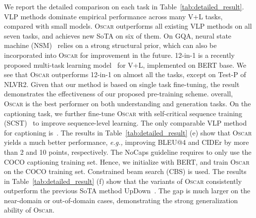 \documentclass[runningheads]{llncs}
\newcommand{\eg}[0]{\emph{e.g., }}
\newcommand{\short}{\textsc{Oscar}}
\newcommand{\shortb}{\textsc{Oscar}}
\begin{document}
We report the detailed comparison on each task in Table~\ref{tab:detailed_result}. 
 VLP methods dominate empirical performance across many V+L tasks, compared with small models. \short{} outperforms all existing VLP methods on all seven tasks, and achieves new SoTA on six of them. On GQA, neural state machine (NSM)~\cite{hudson2019learning} relies on a strong structural prior, which can also be incorporated into \short{} for improvement in the future.
 12-in-1 is a recently proposed multi-task learning model~\cite{lu201912} for V+L, implemented on BERT base. We see that \shortb{} outperforms 12-in-1 on almost all the tasks, except on Test-P of NLVR2. Given that our method is based on single task fine-tuning, the result demonstrates the effectiveness of our proposed pre-training scheme.
 overall, \short{} is the best performer on both understanding and generation tasks. 
On the captioning task, we further fine-tune \short{} with self-critical sequence training (SCST)~\cite{rennie2017self} to improve sequence-level learning. The only comparable VLP method for captioning is~\cite{zhou2019unified}. 
The results in Table~\ref{tab:detailed_result} (e) show that \short{} yields a much better performance, \eg improving BLEU@4 and CIDEr by more than 2 and 10 points, respectively.
 The NoCaps guideline requires to only use the COCO captioning training set. Hence, we initialize with BERT, and train \short{} on the COCO training set. Constrained beam search (CBS) is used. The results in Table~\ref{tab:detailed_result} (f) show that the variants of \short{} consistently outperform the previous SoTA method UpDown~\cite{agrawal2019nocaps}. The gap is much larger on the near-domain or out-of-domain cases, demonstrating the strong generalization ability of \short{}.
\end{document}
